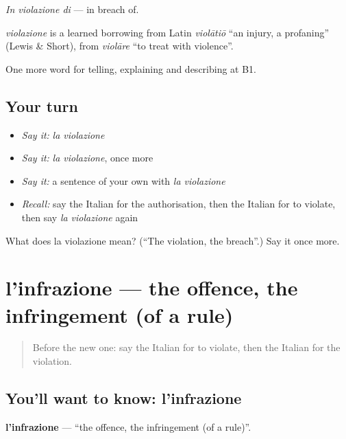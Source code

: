 \emph{In violazione di} — in breach of.

\begin{cousinweb}
\emph{violazione} is a learned borrowing from Latin \emph{violātiō} \textquotedblleft{}an injury, a profaning\textquotedblright{} (Lewis \& Short), from \emph{violāre} \textquotedblleft{}to treat with violence\textquotedblright{}.
\end{cousinweb}

\begin{grammarlens}[title={What you've built}]
One more word for telling, explaining and describing at B1.
\end{grammarlens}

\subsection*{Your turn}
\begin{itemize}
\raggedright
  \item \emph{Say it:} \emph{la violazione}
  \item \emph{Say it:} \emph{la violazione}, once more
  \item \emph{Say it:} a sentence of your own with \emph{la violazione}
  \item \emph{Recall:} say the Italian for the authorisation, then the Italian for to violate, then say \emph{la violazione} again
\end{itemize}

\begin{tcolorbox}[breakable,colback=teal!4,colframe=teal!35!black,title={Before you move on}]
What does la violazione mean? (\textquotedblleft{}The violation, the breach\textquotedblright{}.) Say it once more.
\end{tcolorbox}
\section[l'infrazione]{l'infrazione — the offence, the infringement (of a rule)}

\label{lesson:IT-C386-infrazione}



\begin{quote}
Before the new one: say the Italian for to violate, then the Italian for the violation.
\end{quote}

\subsection*{You'll want to know: l'infrazione}
\textbf{l'infrazione} — \textquotedblleft{}the offence, the infringement (of a rule)\textquotedblright{}.

